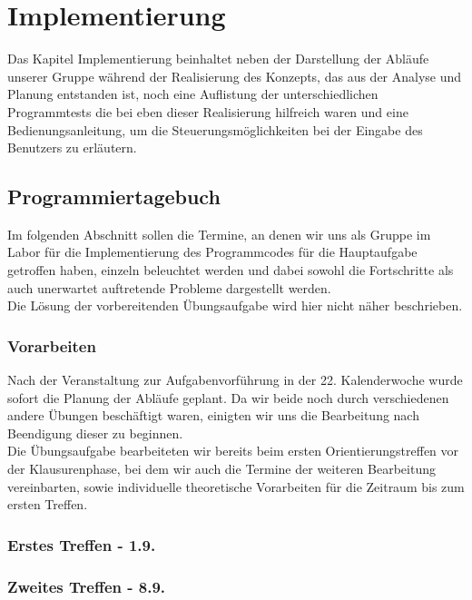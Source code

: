 \chapter{Implementierung}

Das Kapitel Implementierung beinhaltet neben der Darstellung der Abläufe unserer Gruppe während der Realisierung des Konzepts, das aus der Analyse und Planung entstanden ist, noch eine Auflistung der unterschiedlichen Programmtests die bei eben dieser Realisierung hilfreich waren und eine Bedienungsanleitung, um die Steuerungsmöglichkeiten bei der Eingabe des Benutzers zu erläutern.

\section{Programmiertagebuch}

Im folgenden Abschnitt sollen die Termine, an denen wir uns als Gruppe im Labor für die Implementierung des Programmcodes für die Hauptaufgabe getroffen haben, einzeln beleuchtet werden und dabei sowohl die Fortschritte als auch unerwartet auftretende Probleme dargestellt werden.\\
Die Lösung der vorbereitenden Übungsaufgabe wird hier nicht näher beschrieben.

\subsection{Vorarbeiten} 

Nach der Veranstaltung zur Aufgabenvorführung in der 22. Kalenderwoche wurde sofort die Planung der Abläufe geplant. Da wir beide noch durch verschiedenen andere Übungen beschäftigt waren, einigten wir uns die Bearbeitung nach Beendigung dieser zu beginnen.\\
Die Übungsaufgabe bearbeiteten wir bereits beim ersten Orientierungstreffen vor der Klausurenphase, bei dem wir auch die Termine der weiteren Bearbeitung vereinbarten, sowie individuelle theoretische Vorarbeiten für die Zeitraum bis zum ersten Treffen. 

\subsection{Erstes Treffen - 1.9.}

\subsection{Zweites Treffen - 8.9.}

